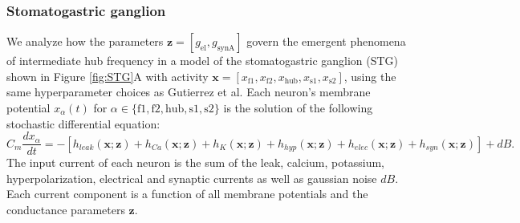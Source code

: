 \documentclass[11pt]{article}
\begin{document}
\subsubsection{Stomatogastric ganglion}\label{methods_STG}
We analyze how the parameters $\mathbf{z} = [ g_{\text{el}}, g_{\text{synA}}]$ govern the emergent phenomena of intermediate hub frequency in a model of the stomatogastric ganglion (STG) \cite{gutierrez2013multiple} shown in Figure \ref{fig:STG}A with activity $\mathbf{x} = \left[ x_{\text{f1}}, x_{\text{f2}}, x_{\text{hub}}, x_{\text{s1}}, x_{\text{s2}} \right]$, using the same hyperparameter choices as Gutierrez et al.
Each neuron's membrane potential $x_\alpha(t)$ for $\alpha \in \{ \text{f1}, \text{f2}, \text{hub}, \text{s1}, \text{s2} \}$ is the solution of the following stochastic differential equation:
\begin{equation} C_m \frac{dx_\alpha}{dt} = - \left[ h_{leak}(\mathbf{x}; \mathbf{z}) + h_{Ca}(\mathbf{x}; \mathbf{z}) + h_K(\mathbf{x}; \mathbf{z}) + h_{hyp}(\mathbf{x}; \mathbf{z}) + h_{elec}(\mathbf{x}; \mathbf{z}) + h_{syn}(\mathbf{x}; \mathbf{z})\right] + dB.
\end{equation} 
The input current of each neuron is the sum of the leak, calcium, potassium, hyperpolarization, electrical and synaptic currents as well as gaussian noise $dB$.
Each current component is a function of all membrane potentials and the conductance parameters $\mathbf{z}$.
\end{document}

